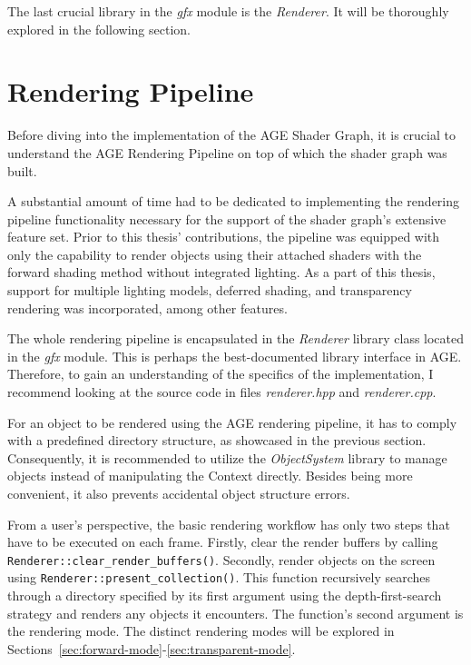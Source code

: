 \documentclass[
  digital,     %
  oneside,     %
  nosansbold,  %
  nocolorbold, %
  lof,         %
  lot,         %
]{fithesis4}
\begin{document}
The last crucial library in the \textit{gfx} module is the \textit{Renderer}. It will be thoroughly explored
in the following section.

\section{Rendering Pipeline}
Before diving into the implementation of the AGE Shader Graph, it is crucial to understand
the AGE Rendering Pipeline on top of which the shader graph was built.

A substantial amount of time had to be dedicated to implementing the rendering pipeline functionality
necessary for the support of the shader graph's extensive feature set.
Prior to this thesis' contributions,
the pipeline was equipped with only the capability to render objects using their attached shaders
with the forward shading method without integrated lighting. As a part of this thesis, support for multiple lighting models,
deferred shading, and transparency rendering was incorporated, among other features.

The whole rendering pipeline is encapsulated in the \textit{Renderer} library class located
in the \textit{gfx} module. This is perhaps the best-documented library interface in AGE.
Therefore, to gain an understanding of the specifics of the implementation,
I recommend looking at the source code in files \textit{renderer.hpp} and \textit{renderer.cpp}.

For an object to be rendered using the AGE rendering pipeline, it has to comply with a predefined
directory structure, as showcased in the previous section. Consequently, it is recommended to utilize
the \textit{ObjectSystem} library to manage objects instead of manipulating the Context directly.
Besides being more convenient, it also prevents accidental object structure errors.

From a user's perspective, the basic rendering workflow has only two steps that have to be executed on each frame.
Firstly, clear the render buffers by calling \verb|Renderer::clear_render_buffers()|. Secondly, render objects
on the screen using \verb|Renderer::present_collection()|. This function recursively searches through a directory
specified by its first argument using the depth-first-search strategy and renders any objects it encounters.
The function's second argument is the rendering mode. The distinct rendering modes will be explored
in Sections~\ref{sec:forward-mode}-\ref{sec:transparent-mode}.
\end{document}
